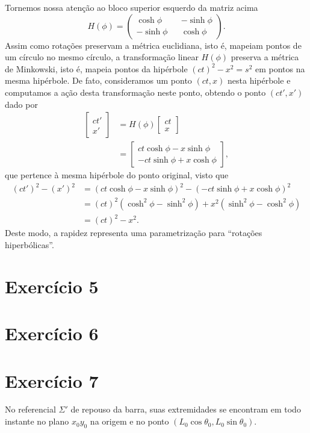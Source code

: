 \documentclass[12pt,a4paper]{article}
\numberwithin{equation}{section}
\begin{document}
Tornemos nossa atenção ao bloco superior esquerdo da matriz acima
\begin{equation*}
    H(\phi) = \begin{pmatrix}
        \cosh \phi && -\sinh \phi\\
        -\sinh \phi && \cosh \phi
    \end{pmatrix}.
\end{equation*}
Assim como rotações preservam a métrica euclidiana, isto é, mapeiam pontos de um círculo no mesmo círculo, a transformação linear \(H(\phi)\) preserva a métrica de Minkowski, isto é, mapeia pontos da hipérbole \((ct)^2 - x^2 = s^2\) em pontos na mesma hipérbole. De fato, consideramos um ponto \((ct, x)\) nesta hipérbole e computamos a ação desta transformação neste ponto, obtendo o ponto \((ct', x')\) dado por
\begin{align*}
    \begin{bmatrix}ct'\\x'\end{bmatrix} &= H(\phi) \begin{bmatrix}ct\\x\end{bmatrix}\\
                                        &= \begin{bmatrix} ct \cosh \phi - x\sinh \phi\\ -ct\sinh \phi + x \cosh \phi \end{bmatrix},
\end{align*}
que pertence à mesma hipérbole do ponto original, visto que
\begin{align*}
    (ct')^2 - (x')^2 &= (ct \cosh \phi - x \sinh \phi)^2 - (-ct \sinh \phi + x \cosh \phi)^2\\
                     &= (ct)^2 \left(\cosh^2 \phi - \sinh^2 \phi\right) + x^2 \left(\sinh^2 \phi - \cosh^2 \phi\right)\\
                     &= (ct)^2 - x^2.
\end{align*}
Deste modo, a rapidez representa uma parametrização para \enquote{rotações hiperbólicas}.

\section*{Exercício 5}
\section*{Exercício 6}
\section*{Exercício 7}
No referencial \(\Sigma'\) de repouso da barra, suas extremidades se encontram em todo instante no plano \(x_0y_0\) na origem e no ponto \((L_0 \cos\theta_0, L_0 \sin \theta_0)\).
\end{document}
